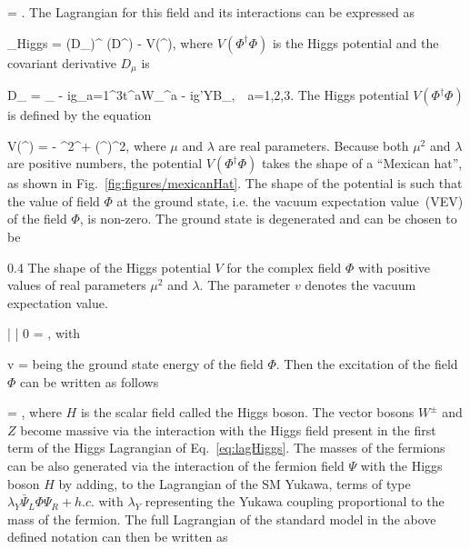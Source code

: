 {
    \Phi = .
}
The Lagrangian for this field and its interactions can be expressed as 

{
    _{Higgs} =  (D_{\mu}\Phi)^{\dagger} (D^{\mu}\Phi) - V(\Phi^{\dagger}\Phi),
}
where $V(\Phi^{\dagger}\Phi)$ is the Higgs potential and the covariant derivative $D_{\mu}$ is

{
   D_{\mu} = \partial_{\mu} - ig\sum_{a=1}^{3}t^{a}W_{\mu}^{a} - ig'YB_{\mu},~~a=1,2,3.
}
The Higgs potential $V(\Phi^{\dagger}\Phi)$ is defined by the equation

{
    V(\Phi^{\dagger}\Phi) =  -  \mu^{2}\Phi^{\dagger}\Phi +  \lambda(\Phi^{\dagger}\Phi)^{2},
}
where $\mu$ and $\lambda$ are real parameters. Because both $\mu^{2}$ and $\lambda$ are positive numbers, the potential $V(\Phi^{\dagger}\Phi)$ takes the shape of a ``Mexican hat'', as shown in Fig.~\ref{fig:figures/mexicanHat}. The shape of the potential is such that the value of field $\Phi$ at the ground state, i.e. the vacuum expectation value~(VEV) of the field $\Phi$, is non-zero. The ground state is degenerated and can be chosen to be

                 {0.4}       %
                 { The shape of the Higgs potential $V$ for the complex field $\Phi$ with positive values of real parameters $\mu^{2}$ and $\lambda$. The parameter $v$ denotes the vacuum expectation value.}

{
     | \Phi | 0 \rangle =  ,
}
with

{
v = 
}
being the ground state energy of the field $\Phi$. Then the excitation of the field $\Phi$ can be written as follows

{
    \Phi = ,
}
where $H$ is the scalar field called the Higgs boson. The vector bosons $W^{\pm}$ and $Z$ become massive via the interaction with the Higgs field present in the first term of the Higgs Lagrangian of Eq.~\ref{eq:lagHiggs}. The masses of the fermions can be also generated via the interaction of the fermion field  $\Psi$ with the Higgs boson $H$ by adding,  to the Lagrangian of the SM Yukawa, terms of type $\lambda_{Y} \bar{\Psi}_{L} \Phi \Psi_{R} + h.c.$ with $\lambda_{Y}$ representing the Yukawa coupling proportional to the mass of the fermion. The full Lagrangian of the standard model in the above defined notation can then be written as

